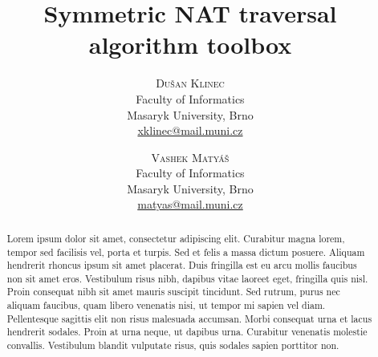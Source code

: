 \documentclass[twoside]{article}
\title{\vspace{-15mm}%
	\fontsize{24pt}{10pt}\selectfont
	\textbf{Symmetric NAT traversal algorithm toolbox}
	}
\author{%
	\large
	\textsc{Du\v{s}an Klinec} \\[2mm]%
	\normalsize	Faculty of Informatics \\
	\normalsize	Masaryk University, Brno \\
	\normalsize	\href{mailto:xklinec@mail.muni.cz}{xklinec@mail.muni.cz}
	\and
	\textsc{Vashek Matyáš} \\[2mm]%
	\normalsize	Faculty of Informatics \\
	\normalsize	Masaryk University, Brno \\
	\normalsize	\href{mailto:matyas@mail.muni.cz}{matyas@mail.muni.cz}
	\vspace{-5mm}
	}
\date{}
\begin{document}
\maketitle
\thispagestyle{fancy}

\begin{abstract}
\noindent Lorem ipsum dolor sit amet, consectetur adipiscing elit. Curabitur magna lorem, tempor sed facilisis vel, porta et turpis. Sed et felis a massa dictum posuere. Aliquam hendrerit rhoncus ipsum sit amet placerat. Duis fringilla est eu arcu mollis faucibus non sit amet eros. Vestibulum risus nibh, dapibus vitae laoreet eget, fringilla quis nisl. Proin consequat nibh sit amet mauris suscipit tincidunt. Sed rutrum, purus nec aliquam faucibus, quam libero venenatis nisi, ut tempor mi sapien vel diam. Pellentesque sagittis elit non risus malesuada accumsan. Morbi consequat urna et lacus hendrerit sodales. Proin at urna neque, ut dapibus urna. Curabitur venenatis molestie convallis. Vestibulum blandit vulputate risus, quis sodales sapien porttitor non.
\end{abstract}
	
\end{document}
